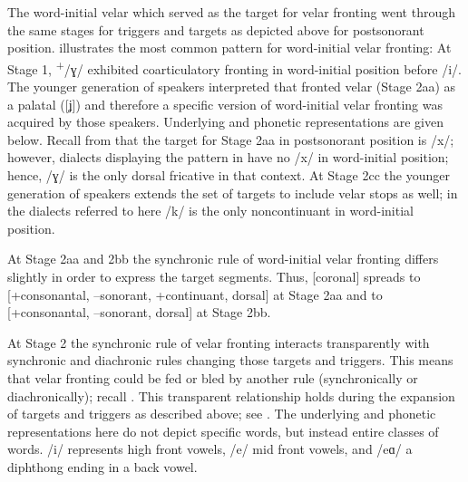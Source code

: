 \begin{sloppypar}
The word-initial velar which served as the target for velar fronting went through the same stages for triggers and targets as depicted above for postsonorant position.  illustrates the most common pattern for word-initial velar fronting: At Stage 1,  \textsuperscript{+}/ɣ/ exhibited coarticulatory fronting in word-initial position before /i/. The younger generation of speakers interpreted that fronted velar (Stage 2aa) as a palatal ([ʝ]) and therefore a specific version of word-initial velar fronting was acquired by those speakers. Underlying and phonetic representations are given below. Recall from  that the target for Stage 2aa in postsonorant position is /x/; however, dialects displaying the pattern in  have no /x/ in word-initial position; hence, /ɣ/ is the only dorsal fricative in that context. At Stage 2cc the younger generation of speakers extends the set of targets to include velar stops as well; in the dialects referred to here /k/ is the only noncontinuant in word-initial position.
\end{sloppypar}

\begin{table}
\caption{Change from Stage 2aa to Stage 2bb to Stage 2cc (word-initial)\label{tab:16:5}}
\end{table}

At Stage 2aa and 2bb the synchronic rule of word-initial velar fronting differs slightly in order to express the target segments. Thus, [coronal] spreads to [+consonantal, --sonorant,                     +continuant, dorsal] at Stage 2aa and to [+consonantal, --sonorant, dorsal] at Stage 2bb.

At Stage 2 the synchronic rule of velar fronting interacts transparently with synchronic and diachronic rules changing those targets and triggers. This means that velar fronting could be fed or bled by another rule (synchronically or diachronically); recall . This transparent relationship holds during the expansion of targets and triggers as described above; see . The underlying and phonetic representations here do not depict specific words, but instead entire classes of words. /i/ represents high front vowels, /e/ mid front vowels, and /eɑ/ a diphthong ending in a back vowel.

